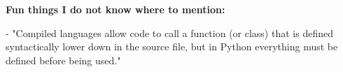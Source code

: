 \documentclass[onecolumn]{article}
\begin{document}
\textbf{Fun things I do not know where to mention:}

- "Compiled languages allow code to call a function (or class) that is defined syntactically lower down in the source file, but in Python everything must be defined before being used." \parencite{GuoMarkelZhang2020}










\newpage
\printbibliography
\end{document}
